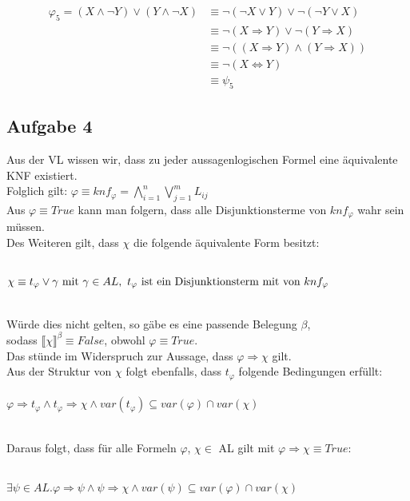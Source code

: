 \documentclass[a4paper,10pt]{article}
\begin{document}
	\begin{align*}
	\varphi_5 = (X \wedge\neg Y) \vee (Y \wedge \neg X) 
	&\equiv \neg (\neg X \vee Y) \vee \neg (\neg Y \vee X) \\
	&\equiv \neg (X \Rightarrow Y) \vee \neg (Y \Rightarrow X) \\
	&\equiv \neg ((X \Rightarrow Y) \wedge (Y \Rightarrow X)) \\
	&\equiv \neg (X \Leftrightarrow Y) \\
	&\equiv \psi_5 
	\end{align*}
	
	\subsection*{Aufgabe 4}
	Aus der VL wissen wir, dass zu jeder aussagenlogischen Formel eine äquivalente KNF existiert. \\
	Folglich gilt: $\varphi \equiv knf_{\varphi} = \bigwedge\limits_{i=1}^{n} \bigvee\limits_{j=1}^{m} L_{ij}$ \\
	Aus $\varphi \equiv True$ kann man folgern, dass alle Disjunktionsterme von $knf_{\varphi}$ wahr sein müssen.\\
	Des Weiteren gilt, dass $\chi$ die folgende äquivalente Form besitzt:
	
	\ \\ \( \chi \equiv t_{\varphi} \vee \gamma \text{ mit } \\
	\gamma \in AL,~t_{\varphi} \text{ ist ein Disjunktionsterm
	mit von } knf_{\varphi} \) 	
	
	\ \\Würde dies nicht gelten, so gäbe es eine passende Belegung $\beta$, \\
	sodass $\llbracket \chi \rrbracket ^\beta \equiv False$, obwohl $\varphi \equiv True$. \\
	Das stünde im Widerspruch zur Aussage, dass $\varphi \Rightarrow \chi$ gilt. \\
	Aus der Struktur von $\chi$ folgt ebenfalls, dass $t_{\varphi}$ folgende Bedingungen erfüllt:\\
	\ \\ \(\varphi \Rightarrow t_{\varphi} \wedge t_{\varphi} \Rightarrow \chi \wedge var(t_{\varphi}) \subseteq 		  	var(\varphi) \cap var(\chi) \)
	
	\ \\Daraus folgt, dass für alle Formeln $\varphi$, $\chi \in$ AL gilt mit $\varphi \Rightarrow \chi \equiv True$:
	
	\ \\ \( \exists \psi \in AL. \varphi \Rightarrow \psi \wedge 
	\psi \Rightarrow \chi \wedge var(\psi) \subseteq var(\varphi) \cap var(\chi) \)
\end{document}
